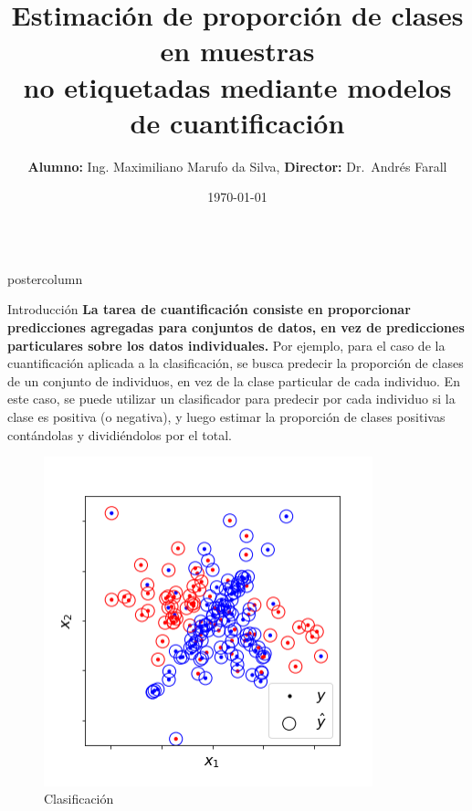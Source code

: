 \documentclass{beamer}
\title{\huge Estimación de proporción de clases en muestras \\ no etiquetadas mediante modelos de cuantificación}
\author{\textbf{Alumno:} Ing. Maximiliano Marufo da Silva, \textbf{Director:} Dr.~Andrés Farall}
\institute[UBA]{Facultad de Ciencias Exactas y Naturales, Universidad de Buenos Aires}
\date{\today}
\newlength{\columnheight}
\begin{document}
\begin{frame}
\begin{columns}
	\begin{column}{.43\textwidth}
		\begin{beamercolorbox}[center]{postercolumn}
			\begin{minipage}{.98\textwidth}  %
				\parbox[t][\columnheight]{\textwidth}{ %

					\begin{myblock}{Introducción}
						\textbf{La tarea de cuantificación consiste en proporcionar predicciones agregadas para
						conjuntos de datos, en vez de predicciones particulares sobre los datos
						individuales.}
						Por ejemplo, para el caso de la cuantificación aplicada a la
						clasificación, se busca predecir la proporción de clases de un conjunto de
						individuos, en vez de la clase particular de cada individuo.
						En este caso, se puede utilizar un clasificador para predecir por cada individuo si la clase es
						positiva (o negativa), y luego estimar la proporción de clases positivas
						contándolas y dividiéndolos por el total. 
						\begin{figure}
							\begin{minipage}{0.45\textwidth}
								\centering\includegraphics[width=0.85\textwidth]{../plots_teoria/intro_scatterplot.png}
								\caption{Clasificación}
							\end{minipage}

\end{figure}
\end{myblock}}
\end{minipage}
\end{beamercolorbox}
\end{column}
\end{columns}
\end{frame}
\end{document}
